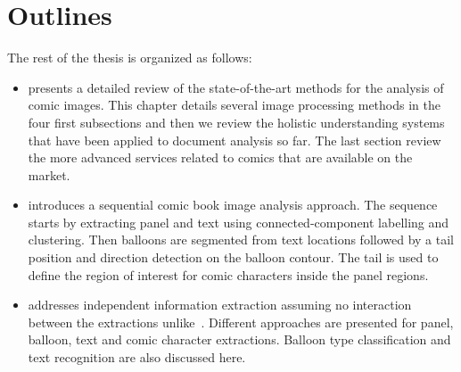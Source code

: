 \section{Outlines}

The rest of the thesis is organized as follows:
\begin{itemize}
\item {} presents a detailed review of the state-of-the-art methods for the analysis of comic images. This chapter details several image processing methods in the four first subsections and then we review the holistic understanding systems that have been applied to document analysis so far.
The last section review the more advanced services related to comics that are available on the market.

\item {} introduces a sequential comic book image analysis approach.
The sequence starts by extracting panel and text using connected-component labelling and clustering.
Then balloons are segmented from text locations followed by a tail position and direction detection on the balloon contour.
The tail is used to define the region of interest for comic characters inside the panel regions.

\item {} addresses independent information extraction assuming no interaction between the extractions unlike~.
Different approaches are presented for panel, balloon, text and comic character extractions.
Balloon type classification and text recognition are also discussed here.



\end{itemize}
